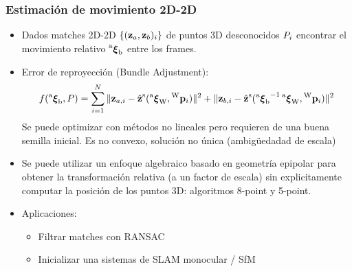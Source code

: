 \begin{frame}
    \frametitle{Estimación de movimiento 2D-2D}
    \footnotesize
    
    \begin{itemize}
        \item Dados matches 2D-2D $\{(\boldsymbol{\mathbf{z}}_{a}, \boldsymbol{\mathbf{z}}_{b})_{i}\}$ de puntos 3D desconocidos $P_{i}$ encontrar el movimiento relativo $\prescript{\mathrm{a}}{}{{\boldsymbol{\mathbf{\xi}}}_\mathrm{b}}$ entre los frames.
        \item Error de reproyección (Bundle Adjustment):
        \[
        f(\prescript{\mathrm{a}}{}{{\boldsymbol{\mathbf{\xi}}}_\mathrm{b}}, P)= \sum_{i=1}^{N} \Vert \boldsymbol{\mathbf{z}}_{a,i} - \hat{\boldsymbol{\mathbf{z}}}^{\mathrm{s}}(\prescript{\mathrm{a}}{}{{\boldsymbol{\mathbf{\xi}}}_\mathrm{\mathrm{W}}},\prescript{\mathrm{\mathrm{W}}}{}{\boldsymbol{\mathbf{p}}}_{i}) \Vert^{2} + \Vert \boldsymbol{\mathbf{z}}_{b,i} - \hat{\boldsymbol{\mathbf{z}}}^{\mathrm{s}}({\prescript{\mathrm{a}}{}{{\boldsymbol{\mathbf{\xi}}}_\mathrm{b}}}^{-1}\prescript{\mathrm{a}}{}{{\boldsymbol{\mathbf{\xi}}}_\mathrm{\mathrm{W}}},\prescript{\mathrm{\mathrm{W}}}{}{\boldsymbol{\mathbf{p}}}_{i}) \Vert^{2}
        \]
        Se puede optimizar con métodos no lineales pero requieren de una buena semilla inicial. Es no convexo, solución no única (ambigüedadad de escala)
        \item Se puede utilizar un enfoque algebraico basado en geometría epipolar para obtener la transformación relativa (a un factor de escala) sin explicitamente computar la posición de los puntos 3D: algoritmos 8-point y 5-point.
        \item Aplicaciones:
        \begin{itemize}
            \item Filtrar matches con RANSAC
            \item Inicializar una sistemas de SLAM monocular / SfM
        \end{itemize}
    \end{itemize}
\end{frame}

